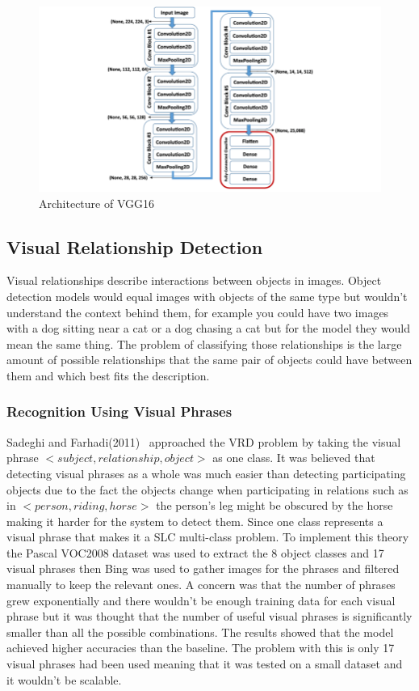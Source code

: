 \documentclass{csfyp}
\begin{document}
\begin{figure}[!htbp]
\includegraphics[scale=0.50,center]{VGG16Blocks.pdf}
\caption{Architecture of VGG16}
\end{figure}

\subsection{Visual Relationship Detection}
Visual relationships describe interactions between objects in images. Object detection models would equal images with objects of the same type but wouldn't understand the context behind them, for example you could have two images with a dog sitting near a cat or a dog chasing a cat but for the model they would mean the same thing. The problem of classifying those relationships is the large amount of possible relationships that the same pair of objects could have between them and which best fits the description. 


\subsubsection{Recognition Using Visual Phrases}
Sadeghi and Farhadi(2011)~\cite{VisualPhrases} approached the VRD problem by taking the visual phrase $<subject, relationship , object>$ as one class. It was believed that detecting visual phrases as a whole was much easier than detecting participating objects due to the fact the objects change when participating in relations such as in $<person,riding,horse>$ the person’s leg might be obscured by the horse making it harder for the system to detect them. Since one class represents a visual phrase that makes it a SLC multi-class problem. To implement this theory the Pascal VOC2008 dataset was used to extract the 8 object classes and 17 visual phrases then Bing was used to gather images for the phrases and filtered manually to keep the relevant ones.  A concern was that the number of phrases grew exponentially and there wouldn’t be enough training data for each visual phrase but it was thought that the number of useful visual phrases is significantly smaller than all the possible combinations. The results showed that the model achieved higher accuracies than the baseline. The problem with this is only 17 visual phrases had been used meaning that it was tested on a small dataset and it wouldn’t be scalable.
\end{document}
